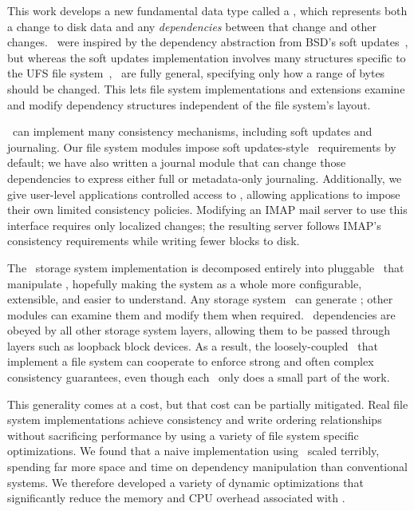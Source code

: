 This work develops a new fundamental data type called a \emph{\patch},
 which represents both a change to disk data and any \emph{dependencies}
 between that change and other changes. 
%
\Patches\ were inspired by the dependency abstraction from BSD's soft
 updates~\cite{ganger00soft}, but whereas the soft updates implementation
 involves many structures specific to the UFS file
 system~\cite{mckusick99soft}, \patches\ are fully general,
 specifying only how a range of bytes should be changed.
%
This lets file system implementations and extensions examine and modify
 dependency structures independent of the file system's layout.


\Patches\ can implement many consistency mechanisms, including
 soft updates and journaling.
%
Our file system modules impose soft updates-style \patch\
 requirements by default; we have also written a journal module that
 can change those dependencies to express either full or metadata-only
 journaling.
%
Additionally, we give user-level applications controlled access to \patches,
allowing applications to impose their own limited consistency
 policies.
%
Modifying an IMAP mail server to use this interface requires only localized
 changes; the resulting server follows IMAP's consistency
 requirements while writing fewer blocks to disk. %


The \Kudos\ storage system implementation is decomposed entirely into
 pluggable \modules\ that manipulate \patches, hopefully making the system
 as a whole more configurable, extensible, and easier to understand.
%
Any storage system \module\ can generate \patches; other modules can examine
 them and modify them when required.
%
\Patch\ dependencies are obeyed by all other storage system layers, allowing
 them to be passed through layers such as loopback block devices.
%
As a result, the loosely-coupled \modules\ that implement a file system
 can cooperate to enforce strong and often complex consistency guarantees,
 even though each \module\ only does a small part of the work.


This generality comes at a cost, but that cost can be partially mitigated.
%
Real file system implementations achieve consistency and write ordering
 relationships without sacrificing performance by using a variety of file
 system specific optimizations.
%
We found that a naive implementation using \patches\ scaled terribly,
 spending far more space and time on dependency manipulation than
 conventional systems.
%
We therefore developed a variety of dynamic optimizations that
 significantly reduce the memory and CPU overhead associated with \patches.


